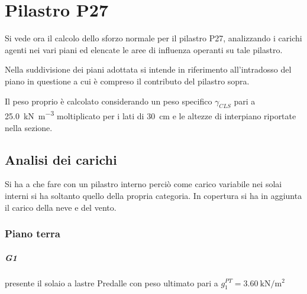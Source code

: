 \chapter{Pilastro P27}
Si vede ora il calcolo dello sforzo normale per il pilastro P27, analizzando i carichi agenti nei vari piani ed elencate le aree di influenza operanti su tale pilastro. 

Nella suddivisione dei piani adottata si intende in riferimento all'intradosso del piano in questione a cui è compreso il contributo del pilastro sopra.

Il peso proprio è calcolato considerando un peso specifico $\gamma_{CLS}$ pari a \SI{25.0}{\kilo\newton\per\meter\cubed} moltiplicato per i lati di \SI{30}{\centi\meter} e le altezze di interpiano riportate nella sezione.
\section{Analisi dei carichi}
Si ha a che fare con un pilastro interno perciò come carico variabile nei solai interni si ha soltanto quello della propria categoria. 
In copertura si ha in aggiunta il carico della neve e del vento.
\subsection{Piano terra}
\paragraph*{G1} \e presente il solaio a lastre Predalle con peso ultimato pari a $g_1^{PT}=\SI{3.60}{\kilo\newton\per\square\meter}$

